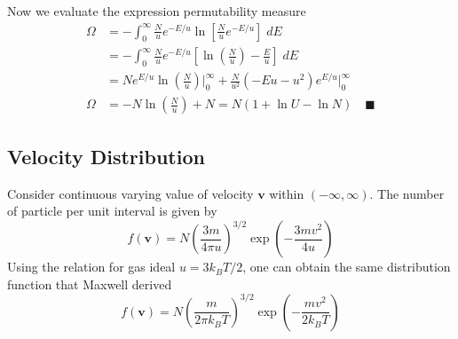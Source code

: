 \documentclass[../../../Main.tex]{subfiles}
\begin{document}
Now we evaluate the expression permutability measure
\begin{align*}
    \Omega&=-\int_{0}^{\infty}\frac{N}{u}e^{-E/u}\ln\left[\frac{N}{u}e^{-E/u}\right]\;dE\\
    &=-\int_{0}^{\infty}\frac{N}{u}e^{-E/u}\left[\ln\left(\frac{N}{u}\right)-\frac{E}{u}\right]\;dE\\
    &=Ne^{E/u}\ln\left(\frac{N}{u}\right)\bigg|_{0}^{\infty}+\frac{N}{u^2}\left(-Eu-u^2\right)e^{E/u}\bigg|_{0}^{\infty}\\
    \Omega&=-N\ln\left(\frac{N}{u}\right)+N=N(1+\ln U-\ln N)\quad\blacksquare
\end{align*}

\subsection{Velocity Distribution}
Consider continuous varying value of velocity $\mathbf{v}$ within $(-\infty,\infty)$. The number of particle per unit interval is given by 
\begin{equation*}
    f(\mathbf{v})=N\left(\frac{3m}{4\pi u}\right)^{3/2}\exp\left(-\frac{3mv^2}{4u}\right)
\end{equation*}
Using the relation for gas ideal $u=3k_BT/2$, one can obtain the same distribution function that Maxwell derived
\begin{equation*}
    f(\mathbf{v})=N\left(\frac{m}{2\pi k_B T}\right)^{3/2}\exp\left(-\frac{m v^2}{2k_B T}\right)
\end{equation*} 
\end{document}
